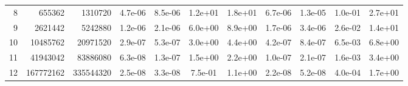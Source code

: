 \begin{table}[h!]
\begin{tabular}{rrrcccccccc}
8   & 655362      & 1310720    & 4.7e-06 & 8.5e-06 & 1.2e+01 & 1.8e+01 & 6.7e-06 & 1.3e-05 & 1.0e-01 & 2.7e+01 \\
9   & 2621442     & 5242880    & 1.2e-06 & 2.1e-06 & 6.0e+00 & 8.9e+00 & 1.7e-06 & 3.4e-06 & 2.6e-02 & 1.4e+01 \\
10  & 10485762    & 20971520   & 2.9e-07 & 5.3e-07 & 3.0e+00 & 4.4e+00 & 4.2e-07 & 8.4e-07 & 6.5e-03 & 6.8e+00 \\
11  & 41943042    & 83886080   & 6.3e-08 & 1.3e-07 & 1.5e+00 & 2.2e+00 & 1.0e-07 & 2.1e-07 & 1.6e-03 & 3.4e+00 \\
12  & 167772162   & 335544320  & 2.5e-08 & 3.3e-08 & 7.5e-01 & 1.1e+00 & 2.2e-08 & 5.2e-08 & 4.0e-04 & 1.7e+00 \\
\bottomrule
\end{tabular}
\end{table}